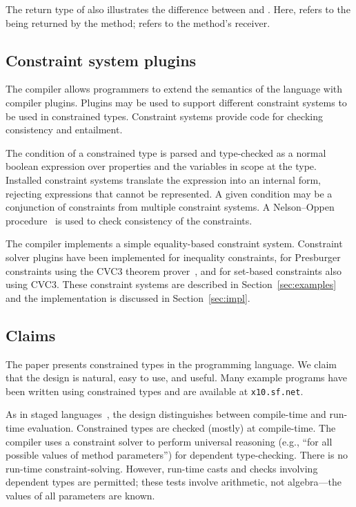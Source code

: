 The return type of  also illustrates the difference
between  and .  Here,  refers to
the  being returned by the method;  refers
to the method's receiver.

\subsection{Constraint system plugins}

The \Xten{} compiler allows  
programmers to extend the semantics of the language with
compiler plugins.  Plugins may be used to support different constraint
systems to be used in constrained types.
Constraint systems provide code for checking consistency and
entailment.

The condition of a constrained type is parsed and type-checked
as a normal boolean expression over properties and
the  variables in scope at the type.  Installed
constraint systems translate the expression into an internal
form, rejecting expressions that cannot be represented.
%
A given condition may be a conjunction of constraints from
multiple constraint systems.
A Nelson--Oppen procedure~\cite{nelson-oppen} is used to check
consistency of the constraints.

The \Xten{} compiler
implements a simple
equality-based constraint system.  Constraint solver plugins
have been implemented for inequality constraints, for
Presburger constraints using
the CVC3 theorem prover~\cite{cvc}, and for
set-based constraints also using CVC3.
These constraint systems are described in
Section~\ref{sec:examples} and the implementation is
discussed in Section~\ref{sec:impl}.

\subsection{Claims}

The paper presents constrained types in the \Xten{} programming
language.
We claim that the design is natural, easy to use, and useful. Many
example programs have been written using constrained types and are
available at {\tt x10.sf.net}.

As in staged languages~\cite{nielson-multistage,ts97-multistage}, the
design distinguishes between compile-time and run-time
evaluation. Constrained types are checked (mostly) at compile-time.
The compiler uses a constraint solver to perform universal reasoning
(e.g., ``for all possible values of method parameters'') for dependent
type-checking.  There is no run-time constraint-solving.  However,
run-time casts and  checks involving dependent types
are permitted; these tests involve
arithmetic, not algebra---the values of all parameters are known.

